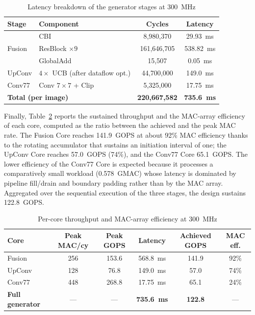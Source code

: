 \begin{table}[H]
    \centering
    \caption{Latency breakdown of the generator stages at 300~MHz}
    \label{tab:latency_breakdown}
    \small
    \renewcommand{\arraystretch}{1.2}
    \begin{tabular}{|l|l|c|c|}
        \hline
        \textbf{Stage} & \textbf{Component} & \textbf{Cycles} & \textbf{Latency} \\
        \hline
        \multirow{3}{*}{Fusion} & CBI & 8,980,370 & 29.93~ms \\
        \cline{2-4}
         & ResBlock $\times 9$ & 161,646,705 & 538.82~ms \\
        \cline{2-4}
         & GlobalAdd & 15,507 & 0.05~ms \\
        \hline
        UpConv & $4\times$ UCB (after dataflow opt.) & 44,700,000 & 149.0~ms \\
        \hline
        Conv77 & Conv $7\times7$ + Clip & 5,325,000 & 17.75~ms \\
        \hline
        \multicolumn{2}{|l|}{\textbf{Total (per image)}} & \textbf{220,667,582} & \textbf{735.6~ms} \\
        \hline
    \end{tabular}
\end{table}

Finally, Table~\ref{tab:throughput_breakdown} reports the sustained throughput and the MAC-array efficiency of each core, computed as the ratio between the achieved and the peak MAC rate. The Fusion Core reaches 141.9~GOPS at about 92\% MAC efficiency thanks to the rotating accumulator that sustains an initiation interval of one; the UpConv Core reaches 57.0~GOPS (74\%), and the Conv77 Core 65.1~GOPS. The lower efficiency of the Conv77 Core is expected because it processes a comparatively small workload (0.578~GMAC) whose latency is dominated by pipeline fill/drain and boundary padding rather than by the MAC array. Aggregated over the sequential execution of the three stages, the design sustains 122.8~GOPS.

\begin{table}[H]
    \centering
    \caption{Per-core throughput and MAC-array efficiency at 300~MHz}
    \label{tab:throughput_breakdown}
    \small
    \renewcommand{\arraystretch}{1.2}
    \begin{tabular}{|l|c|c|c|c|c|}
        \hline
        \textbf{Core} & \textbf{Peak MAC/cy} & \textbf{Peak GOPS} & \textbf{Latency} & \textbf{Achieved GOPS} & \textbf{MAC eff.} \\
        \hline
        Fusion & 256 & 153.6 & 568.8~ms & 141.9 & 92\% \\
        \hline
        UpConv & 128 & 76.8 & 149.0~ms & 57.0 & 74\% \\
        \hline
        Conv77 & 448 & 268.8 & 17.75~ms & 65.1 & 24\% \\
        \hline
        \textbf{Full generator} & --- & --- & \textbf{735.6~ms} & \textbf{122.8} & --- \\
        \hline
    \end{tabular}
\end{table}

